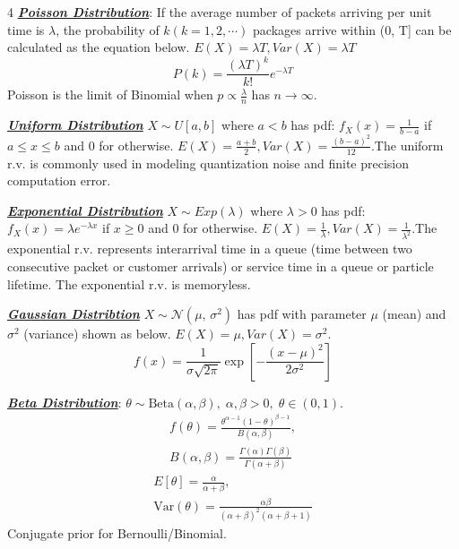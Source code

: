 \documentclass[12pt]{article}
\newcommand{\bulletPoint}[1]{\ul{\textit{\textbf{#1}}}}
\begin{document}
\begin{multicols*}{4}
\bulletPoint{Poisson Distribution}: 
If the average number of packets arriving per unit time is $\lambda$, the probability of $k (k=1,2,\cdots)$ packages arrive within (0, T] can be calculated as the equation below. $E(X)=\lambda T, Var(X)=\lambda T$
\useshortskip \begin{equation*}
    P({k}) = \frac{(\lambda T)^k}{k!} e^{-\lambda T}
\end{equation*}
Poisson is the limit of Binomial when $p \propto \frac{\lambda}{n}$ has $n \rightarrow \infty$.


\bulletPoint{Uniform Distribution}
$X \sim U[a, b]$ where $a < b$ has pdf: $f_X(x) = \frac{1}{b-a}$ if $a \leq x \leq b$ and 0 for otherwise. $E(X)=\frac{a+b}{2}, Var(X)=\frac{(b-a)^2}{12}$.The uniform r.v. is commonly used in modeling quantization noise and finite precision computation error.


\bulletPoint{Exponential Distribution}
$X \sim Exp(\lambda)$ where $\lambda > 0$ has pdf: $f_X(x) = \lambda e^{-\lambda x}$ if $x \geq 0$ and 0 for otherwise. $E(X)=\frac{1}{\lambda}, Var(X)=\frac{1}{\lambda^2}$.The exponential r.v. represents interarrival time in a queue (time between two consecutive packet or customer arrivals) or service time in a queue or particle lifetime. The exponential r.v. is memoryless.

\bulletPoint{Gaussian Distribtion}
$X \sim \mathcal{N}(\mu,\,\sigma^{2})$ has pdf with parameter $\mu$ (mean) and $\sigma ^2$ (variance) shown as below. $E(X)=\mu, Var(X)=\sigma^2$.
\useshortskip \begin{equation*}
    f(x)=\frac{1}{\sigma\sqrt{2\pi}}\exp{[-\frac{(x-\mu)^{2}}{2\sigma^{2}}]}
\end{equation*}

\bulletPoint{Beta Distribution}:
$\theta\sim \mathrm{Beta}(\alpha,\beta),\; \alpha,\beta>0,\; \theta\in(0,1)$.
\useshortskip \begin{equation*}
    \begin{split}
           f(\theta)=\frac{\theta^{\alpha-1}(1-\theta)^{\beta-1}}{B(\alpha,\beta)}, \\
    B(\alpha,\beta)=\frac{\Gamma(\alpha)\Gamma(\beta)}{\Gamma(\alpha+\beta)} 
    \end{split}
\end{equation*}
\useshortskip \begin{equation*}
\begin{split}
        E[\theta]=\frac{\alpha}{\alpha+\beta}, \\
    \mathrm{Var}(\theta)=\frac{\alpha\beta}{(\alpha+\beta)^2(\alpha+\beta+1)}
\end{split}
\end{equation*}
Conjugate prior for Bernoulli/Binomial.


\end{multicols*}
\end{document}
